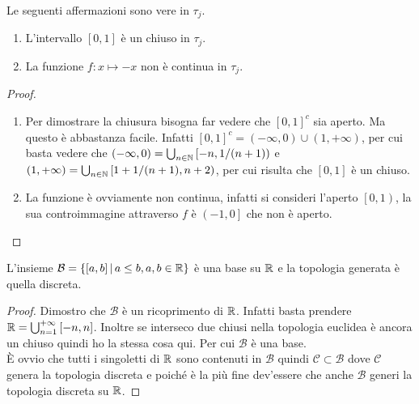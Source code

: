 \begin{theorem}
	Le seguenti affermazioni sono vere in $\tau_j$.
	\begin{enumerate}
		\item L'intervallo $\left[0,1\right]$ è un chiuso in $\tau_j$. 
		\item La funzione $f \colon x \mapsto -x$ non è continua in $\tau_j$.
	\end{enumerate}
\end{theorem}
\begin{proof}
	\begin{enumerate}
		\item Per dimostrare la chiusura bisogna far vedere che $\left[0,1\right]^c$ sia aperto. Ma questo è abbastanza facile. Infatti $\left[0,1\right]^c = \left(-\infty, 0\right) \cup \left(1, +\infty\right)$, per cui basta vedere che $\left(-\infty, 0\right) = \bigcup_{n \in \mathbb{N}} \left[-n, 1/(n+1)\right)$ e $\left(1, +\infty\right) = \bigcup_{n \in \mathbb{N}} \left[1+1/(n+1), n+2\right)$, per cui risulta che $\left[0,1\right]$ è un chiuso.
		\item La funzione è ovviamente non continua, infatti si consideri l'aperto $\left[0,1\right)$, la sua controimmagine attraverso $f$ è $\left(-1, 0\right]$ che non è aperto.
	\end{enumerate}
\end{proof}

\begin{theorem}
	L'insieme $\mathcal{B} = \left\{ \left[a, b\right] \,\middle|\, a \le b, a, b \in \mathbb{R} \right\}$ è una base su $\mathbb{R}$ e la topologia generata è quella discreta. 
\end{theorem}
\begin{proof}
	Dimostro che $\mathcal{B}$ è un ricoprimento di $\mathbb{R}$. Infatti basta prendere $\mathbb{R} = \bigcup^{+\infty}_{n=1} \left[-n, n\right]$. Inoltre se interseco due chiusi nella topologia euclidea è ancora un chiuso quindi ho la stessa cosa qui. Per cui $\mathcal{B}$ è una base. \\ 
	
	È ovvio che tutti i singoletti di $\mathbb{R}$ sono contenuti in $\mathcal{B}$ quindi $\mathcal{C}\subset \mathcal{B}$ dove $\mathcal{C}$ genera la topologia discreta e poiché è la più fine dev'essere che anche $\mathcal{B}$ generi la topologia discreta su $\mathbb{R}$.
\end{proof}

